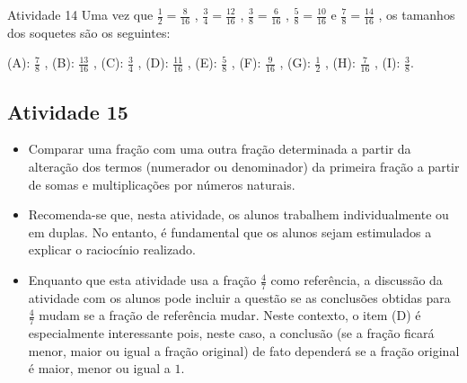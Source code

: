 \begin{resposta*}{Atividade 14}
  Uma vez que   $\frac{1}{2} = \frac{8}{16}$  ,   $\frac{3}{4} = \frac{12}{16}$
,   $\frac{3}{8} = \frac{6}{16}$  ,   $\frac{5}{8} = \frac{10}{16}$   e
$\frac{7}{8} = \frac{14}{16}$  , os tamanhos dos soquetes são os seguintes:

  (A):   $\frac{7}{8}$  ,
  (B):   $\frac{13}{16}$  ,
  (C):   $\frac{3}{4}$  ,
  (D):   $\frac{11}{16}$  ,
  (E):   $\frac{5}{8}$  ,
  (F):   $\frac{9}{16}$  ,
  (G):   $\frac{1}{2}$  ,
  (H):   $\frac{7}{16}$  ,
  (I):   $\frac{3}{8}$.
\end{resposta*}



\subsection{Atividade 15}

\begin{itemize} %
    \item       Comparar uma fração com uma outra fração determinada a partir da
alteração dos termos (numerador ou denominador) da primeira fração a partir de
somas e multiplicações por números naturais.
\end{itemize} %



\begin{itemize} %
    \item       Recomenda-se que, nesta atividade, os alunos trabalhem
individualmente ou em duplas. No entanto, é fundamental que os alunos sejam
estimulados a explicar o raciocínio realizado.
    \item       Enquanto que esta atividade usa a fração       $\frac{4}{7}$
  como referência, a discussão da atividade com os alunos pode incluir a questão
se as conclusões obtidas para       $\frac{4}{7}$       mudam se a fração de
referência mudar. Neste contexto, o item (D) é especialmente interessante pois,
neste caso, a conclusão (se a fração ficará menor, maior ou igual a fração
original) de fato dependerá se a fração original é maior, menor ou igual a
$1$.
\end{itemize} %


   \vspace{.1cm}

 \vspace{.1cm}

